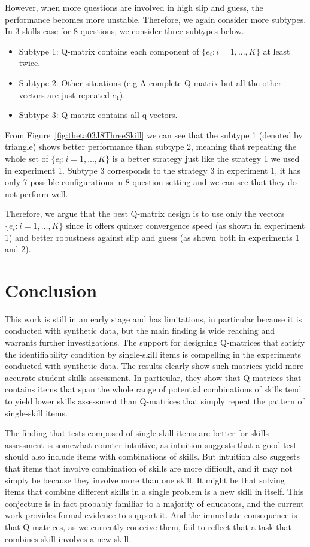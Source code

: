 \documentclass{edm_template}
\begin{document}
However, when more questions are involved in high slip and guess, the performance becomes more unstable. Therefore, we again consider more subtypes. In 3-skills case for 8 questions, we consider three subtypes below. 
\begin{itemize}
\item Subtype 1: Q-matrix contains each component of $\{e_{i}:i=1,...,K\}$ at least twice. 
\item Subtype 2: Other situations (e.g A complete Q-matrix but all the other vectors are just repeated $e_1$).
\item Subtype 3: Q-matrix contains all q-vectors.
\end{itemize}
From Figure~\ref{fig:theta03J8ThreeSkill} we can see that the subtype 1 (denoted by triangle) shows better performance than subtype 2, meaning that repeating the whole set of $\{e_{i}:i=1,...,K\}$ is a better strategy just like the strategy 1 we used in experiment 1. Subtype 3 corresponds to the strategy 3 in experiment 1, it has only 7 possible configurations in 8-question setting and we can see that they do not perform well.

Therefore, we argue that the best Q-matrix design is to use only the vectors $\{e_{i}:i=1,...,K\}$ since it offers quicker convergence speed (as shown in experiment 1) and better robustness against slip and guess (as shown both in experiments 1 and 2).

\section{Conclusion}

This work is still in an early stage and has limitations, in particular because it is conducted with synthetic data, but the main finding is wide reaching and warrants further investigations.  The support for designing Q-matrices that satisfy the identifiability condition by single-skill items is compelling in the experiments conducted with synthetic data.  The results clearly show such matrices yield more accurate student skills assessment. In particular, they show that Q-matrices that contains items that span the whole range of potential combinations of skills tend to yield lower skills assessment than Q-matrices that simply repeat the pattern of single-skill items.

The finding that tests composed of single-skill items are better for skills assessment is somewhat counter-intuitive, as intuition suggests that a good test should also include items with combinations of skills.  But intuition also suggests that items that involve combination of skills are more difficult, and it may not simply be because they involve more than one skill.  It might be that solving items that combine different skills in a single problem is a new skill in itself.  This conjecture is in fact probably familiar to a majority of educators, and the current work provides formal evidence to support it.  And the immediate consequence is that Q-matrices, as we currently conceive them, fail to reflect that a task that combines skill involves a new skill.
\end{document}
